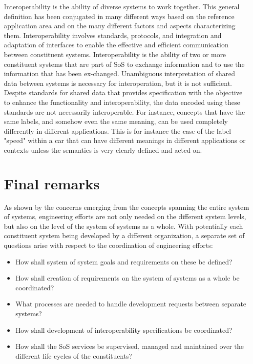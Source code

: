 \documentclass{llncs}
\begin{document}
Interoperability is the ability of diverse systems to work together. This general definition has been conjugated in many different ways based on the reference application area and on the many different factors and aspects characterizing them. Interoperability involves standards, protocols, and integration and adaptation of interfaces to enable the effective and efficient communication between constituent systems. Interoperability is the ability of two or more constituent systems that are part of SoS to exchange information and to use the information that has been ex-changed. Unambiguous interpretation of shared data between systems is necessary for interoperation, but it is not sufficient. Despite standards for shared data that provides specification with the objective to enhance the functionality and interoperability, the data encoded using these standards are not necessarily interoperable. For instance, concepts that have the same labels, and somehow even the same meaning, can be used completely differently in different applications. This is for instance the case of the label "speed" within a car that can have different meanings in different applications or contexts unless the semantics is very clearly defined and acted on.

\section*{Final remarks}
As shown by the concerns emerging from the concepts spanning the entire system of systems, engineering efforts are not only needed on the different system levels, but also on the level of the system of systems as a whole. With potentially each constituent system being developed by a different organization, a separate set of questions arise with respect to the coordination of engineering efforts: 

\begin{itemize}
\item How shall system of system goals and requirements on these be defined? 
\item How shall creation of requirements on the system of systems as a whole be coordinated? 
\item What processes are needed to handle development requests between separate systems? 
\item How shall development of interoperability specifications be coordinated? 
\item How shall the SoS services be supervised, managed and maintained over the different life cycles of the constituents?
\end{itemize}
\end{document}
